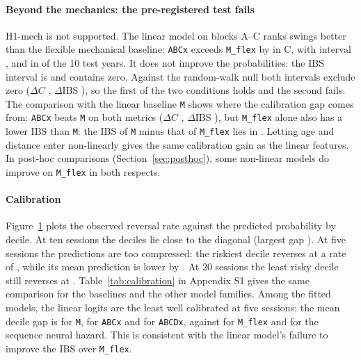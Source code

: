 \paragraph{Beyond the mechanics: the pre-registered test fails} H1-mech is not supported. The
linear model on blocks A--C ranks swings better than the flexible mechanical baseline:
\texttt{ABCx} exceeds \texttt{M\_flex} by \GainOverMFlex{} in C, with interval \PrimDCABCxMFlex,
and in \YearsAboveABCxMFlex{} of the 10 test years. It does not improve the probabilities: the IBS
interval is \PrimDIBSABCxMFlex{} and contains zero. Against the random-walk null both intervals
exclude zero ($\Delta C$ \PrimDCABCxRW, $\Delta$IBS \PrimDIBSABCxRW), so the first of the two
conditions holds and the second fails. The comparison with the linear baseline \texttt{M} shows
where the calibration gap comes from: \texttt{ABCx} beats \texttt{M} on both metrics ($\Delta C$
\DCABCxM, $\Delta$IBS \DIBSABCxM), but \texttt{M\_flex} alone also has a lower IBS than
\texttt{M}: the IBS of \texttt{M} minus that of \texttt{M\_flex} lies in \DIBSMMFlex. Letting age and distance enter
non-linearly gives the same calibration gain as the linear features. In post-hoc comparisons
(Section~\ref{sec:posthoc}), some non-linear models do improve on \texttt{M\_flex} in both
respects.

\paragraph{Calibration} Figure~\ref{fig:calibration} plots the observed reversal rate against the
predicted probability by decile. At ten sessions the deciles lie close to the diagonal (largest
gap \CalMaxGapTen). At five sessions the predictions are too compressed: the riskiest decile
reverses at a rate of \CalTopObsFive, while its mean prediction is lower by \CalMaxGapFive. At 20
sessions the least risky decile still reverses at \CalBottomObsTwenty. Table~\ref{tab:calibration} in Appendix S1 gives
the same comparison for the baselines and the other model families. Among the fitted
models, the linear logits are the least well calibrated at five sessions: the mean decile gap is
\CalMeanGapFiveM{} for \texttt{M}, \CalMeanGapFiveABCx{} for \texttt{ABCx} and
\CalMeanGapFiveABCDx{} for \texttt{ABCDx}, against \CalMeanGapFiveMFlex{} for \texttt{M\_flex}
and \CalMeanGapFiveNnSeqABCD{} for the sequence neural hazard. This is
consistent with the linear model's failure to improve the IBS over \texttt{M\_flex}.

\begin{figure}[!htbp]
\centering
{}
\caption{\FigOneLegend}\label{fig:calibration}
\end{figure}

